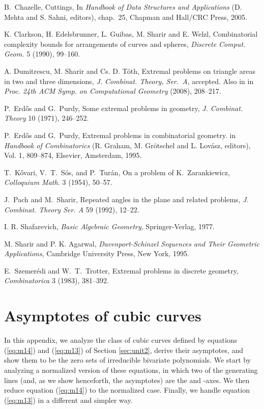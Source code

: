 \documentclass[12pt]{article}
\begin{document}
\begin{thebibliography}{99}

B.~Chazelle,
Cuttings,
In {\em Handbook of Data Structures and Applications}
(D. Mehta and S. Sahni, editors), chap.~25, Chapman and Hall/CRC Press, 2005.

K. Clarkson, H. Edelsbrunner, L. Guibas, M. Sharir and E. Welzl,
Combinatorial complexity bounds for arrangements of curves and
spheres,
{\it Discrete Comput. Geom.} 5 (1990), 99--160.

A. Dumitrescu, M. Sharir and Cs. D. T\'oth,
Extremal problems on triangle areas in two and three dimensions,
{\it J. Combinat. Theory, Ser.~A}, accepted. Also in
in {\it Proc. 24th ACM Symp. on Computational Geometry} (2008), 208--217.

P.~Erd\H{o}s and G.~Purdy,
Some extremal problems in geometry,
{\it J. Combinat. Theory} 10 (1971), 246--252.

P.~Erd\H os and G.~Purdy,
Extremal problems in combinatorial geometry.
in {\em Handbook of Combinatorics}
(R. Graham, M. Gr\"otschel and L. Lov\'asz, editors),
Vol. 1, 809--874, Elsevier, Amsterdam, 1995.

T.~K\H{o}vari, V.~T.~S\'os, and P.~Tur\'an,
On a problem of K.~Zarankiewicz,
{\it Colloquium Math.} 3 (1954), 50--57.

J.~Pach and M.~Sharir,
Repeated angles in the plane and related problems,
{\it J. Combinat. Theory Ser. A} 59 (1992), 12--22.

I. R. Shafarevich,
{\it Basic Algebraic Geometry},
Springer-Verlag, 1977.

M. Sharir and P. K. Agarwal,
{\it Davenport-Schinzel Sequences and Their Geometric Applications},
Cambridge University Press, New York, 1995.

E.~Szemer\'edi and W.~T.~Trotter,
Extremal problems in discrete geometry,
{\it Combinatorica} 3 (1983), 381--392.

\end{thebibliography}

\appendix

\section{Asymptotes of cubic curves}
In this appendix, we analyze the class of cubic curves defined by
equations (\ref{eq:m14}) and (\ref{eq:m13}) of Section
\ref{sec:unit2}, derive their asymptotes, and show them to be the
zero sets of irreducible bivariate polynomials.
We start by analyzing a normalized version
of these equations, in which two of the generating lines
(and, as we show henceforth, the asymptotes) are the  and -axes.
We then reduce equation (\ref{eq:m14}) to the normalized case.
Finally, we handle equation (\ref{eq:m13}) in a different and simpler
way.
\end{document}
